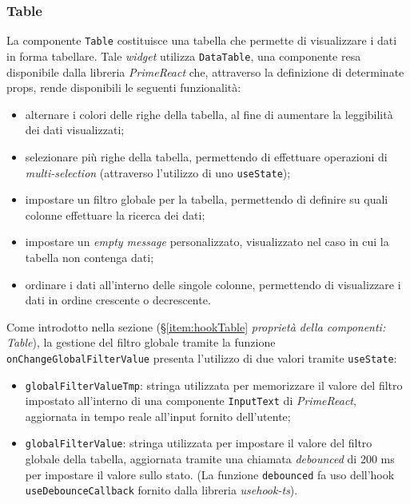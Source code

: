\subsubsection{Table}
La componente \texttt{Table} costituisce una tabella che permette di visualizzare i dati in forma tabellare. \newline
Tale \textit{widget} utilizza \texttt{DataTable}, una componente resa disponibile dalla libreria \textit{PrimeReact} che, attraverso
la definizione di determinate props, rende disponibili le seguenti funzionalità:
\begin{itemize}
    \item alternare i colori delle righe della tabella, al fine di aumentare la leggibilità dei dati visualizzati;
    \item selezionare più righe della tabella, permettendo di effettuare operazioni di \textit{multi-selection} (attraverso
          l'utilizzo di uno \texttt{useState});
    \item impostare un filtro globale per la tabella, permettendo di definire su quali colonne effettuare la ricerca dei dati;
    \item impostare un \textit{empty message} personalizzato, visualizzato nel caso in cui la tabella non contenga dati;
    \item ordinare i dati all'interno delle singole colonne, permettendo di visualizzare i dati in ordine crescente o decrescente.
\end{itemize}
Come introdotto nella sezione (\S \ref{item:hookTable}{ \textit{proprietà della componenti: Table}}), la gestione del filtro globale tramite
la funzione \texttt{onChangeGlobalFilterValue} presenta l'utilizzo di due valori tramite \texttt{useState}:
\begin{itemize}
    \item \texttt{globalFilterValueTmp}: stringa utilizzata per memorizzare il valore del filtro impostato all'interno di una
          componente \texttt{InputText} di \textit{PrimeReact}, aggiornata in tempo reale all'input fornito dell'utente;
    \item \texttt{globalFilterValue}: stringa utilizzata per impostare il valore del filtro globale della tabella, aggiornata
          tramite una chiamata \textit{debounced} di 200 ms per impostare il valore sullo stato. \newline
          (La funzione \texttt{debounced} fa uso dell'hook \texttt{useDebounceCallback} fornito dalla libreria \textit{usehook-ts}).
\end{itemize}
